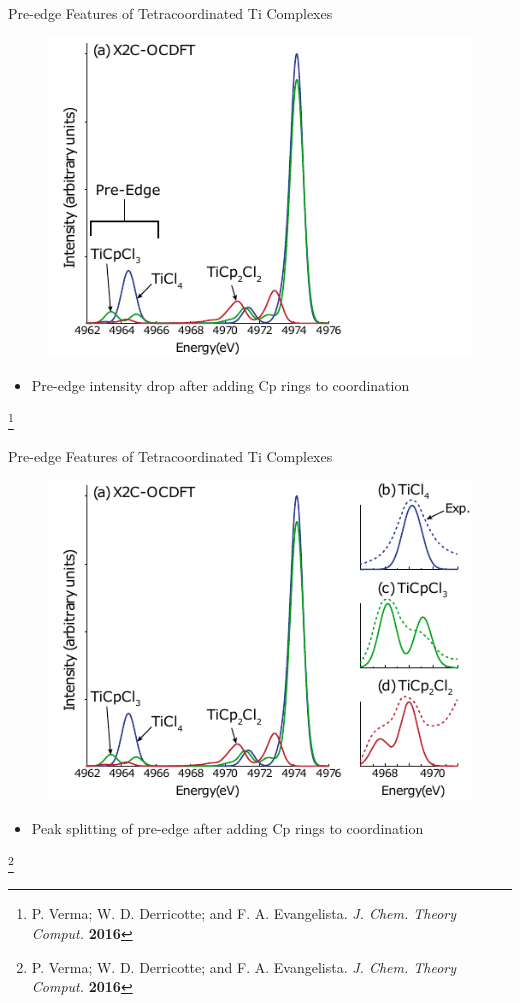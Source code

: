 \documentclass[t]{beamer}
\newcommand\blfootnote[1]{%
  \begingroup
  \renewcommand\thefootnote{}\footnote{#1}%
  \addtocounter{footnote}{-1}%
  \endgroup
}
\begin{document}
\begin{frame}{Pre-edge Features of Tetracoordinated Ti Complexes}
\begin{figure}
\includegraphics[scale=1.0]{ti_pre_edge_1.pdf}
\end{figure}
\begin{itemize}
\item Pre-edge intensity drop after adding Cp rings to coordination
\end{itemize}
\blfootnote{P. Verma; W. D. Derricotte; and F. A. Evangelista. \textit{J. Chem. Theory Comput.} \textbf{2016}}
\end{frame}

\begin{frame}{Pre-edge Features of Tetracoordinated Ti Complexes}
\begin{figure}
\includegraphics[scale=1.0]{ti_pre_edge_2.pdf}
\end{figure}
\begin{itemize}
\item Peak splitting of pre-edge after adding Cp rings to coordination
\end{itemize}
\blfootnote{P. Verma; W. D. Derricotte; and F. A. Evangelista. \textit{J. Chem. Theory Comput.} \textbf{2016}}
\end{frame}
\end{document}
